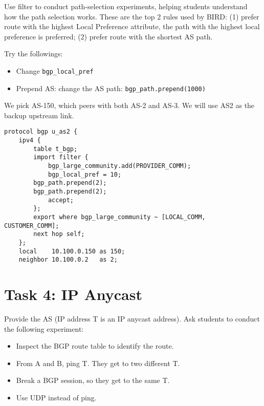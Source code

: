 Use filter to conduct path-selection experiments, helping students
understand how the path selection works.
These are the top 2 rules used by BIRD: 
(1) prefer route with the highest Local Preference attribute,
the path with the highest local preference is preferred;
(2) prefer route with the shortest AS path.


Try the followings:
\begin{itemize}
  \item Change \texttt{bgp\_local\_pref} 
  \item Prepend AS: change the AS path: \texttt{bgp\_path.prepend(1000)} 
\end{itemize}
 

We pick AS-150, which peers with both AS-2 and AS-3. 
We will use AS2 as the backup upstream link.

\begin{lstlisting}
protocol bgp u_as2 {
    ipv4 {
        table t_bgp;
        import filter {
            bgp_large_community.add(PROVIDER_COMM);
            bgp_local_pref = 10;
	    bgp_path.prepend(2);
	    bgp_path.prepend(2);
            accept;
        };
        export where bgp_large_community ~ [LOCAL_COMM, CUSTOMER_COMM];
        next hop self;
    };
    local    10.100.0.150 as 150;
    neighbor 10.100.0.2   as 2;
\end{lstlisting}
 


\section{Task 4: IP Anycast} 

Provide the AS (IP address T is an IP anycast address). 
Ask students to conduct the following experiment:

\begin{itemize}
  \item Inspect the BGP route table to identify the route.
  \item From A and B, ping T. They get to two different T.
  \item Break a BGP session, so they get to the same T.
  \item Use UDP instead of ping.
\end{itemize}
 


